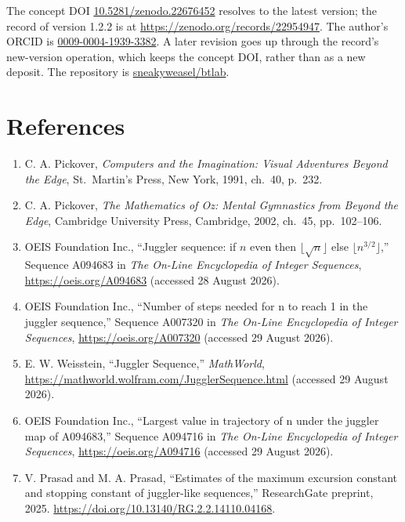 \documentclass[12pt]{article}
\begin{document}
The concept DOI
\href{https://doi.org/10.5281/zenodo.22676452}{10.5281/zenodo.22676452}
resolves to the latest version; the record of version 1.2.2 is at
\url{https://zenodo.org/records/22954947}. The author's ORCID is
\href{https://orcid.org/0009-0004-1939-3382}{0009-0004-1939-3382}. A
later revision goes up through the record's new-version operation, which
keeps the concept DOI, rather than as a new deposit. The repository is
\href{https://github.com/sneakyweasel/btlab}{sneakyweasel/btlab}.

\section{References}\label{references}

\begingroup\small

\begin{enumerate}
\def\labelenumi{\arabic{enumi}.}
\item
  C. A. Pickover, \emph{Computers and the Imagination: Visual Adventures
  Beyond the Edge}, St.~Martin's Press, New York, 1991, ch.~40, p.~232.
\item
  C. A. Pickover, \emph{The Mathematics of Oz: Mental Gymnastics from
  Beyond the Edge}, Cambridge University Press, Cambridge, 2002, ch.~45,
  pp.~102--106.
\item
  OEIS Foundation Inc., ``Juggler sequence: if \(n\) even then
  \(\lfloor\sqrt n\rfloor\) else \(\lfloor n^{3/2}\rfloor\),'' Sequence
  A094683 in \emph{The On-Line Encyclopedia of Integer Sequences},
  \url{https://oeis.org/A094683} (accessed 28 August 2026).
\item
  OEIS Foundation Inc., ``Number of steps needed for n to reach 1 in the
  juggler sequence,'' Sequence A007320 in \emph{The On-Line Encyclopedia
  of Integer Sequences}, \url{https://oeis.org/A007320} (accessed 29
  August 2026).
\item
  E. W. Weisstein, ``Juggler Sequence,'' \emph{MathWorld},
  \url{https://mathworld.wolfram.com/JugglerSequence.html} (accessed 29
  August 2026).
\item
  OEIS Foundation Inc., ``Largest value in trajectory of n under the
  juggler map of A094683,'' Sequence A094716 in \emph{The On-Line
  Encyclopedia of Integer Sequences}, \url{https://oeis.org/A094716}
  (accessed 29 August 2026).
\item
  V. Prasad and M. A. Prasad, ``Estimates of the maximum excursion
  constant and stopping constant of juggler-like sequences,''
  ResearchGate preprint, 2025.
  \url{https://doi.org/10.13140/RG.2.2.14110.04168}.

\end{enumerate}
\end{document}
